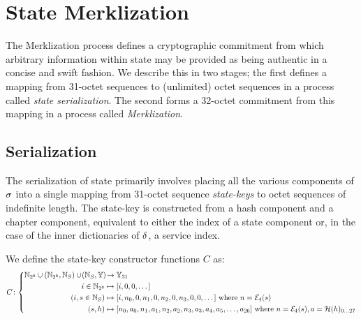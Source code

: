 \section{State Merklization}\label{sec:statemerklization}

The Merklization process defines a cryptographic commitment from which arbitrary information within state may be provided as being authentic in a concise and swift fashion. We describe this in two stages; the first defines a mapping from 31-octet sequences to (unlimited) octet sequences in a process called \emph{state serialization}. The second forms a 32-octet commitment from this mapping in a process called \emph{Merklization}.

\subsection{Serialization}

The serialization of state primarily involves placing all the various components of $\sigma$ into a single mapping from 31-octet sequence \emph{state-keys} to octet sequences of indefinite length. The state-key is constructed from a hash component and a chapter component, equivalent to either the index of a state component or, in the case of the inner dictionaries of $\delta$, a service index.

We define the state-key constructor functions $C$ as:
\begin{equation}
  C\colon\abracegroup{
    \Nbits{8} \cup (\Nbits{8}, \serviceid) \cup \tup{\serviceid, \blob} &\to \blob_{31} \\
    i \in \Nbits{8} &\mapsto [i, 0, 0, \dots] \\
    (i, s \in \serviceid) &\mapsto [i, n_0, 0, n_1, 0, n_2, 0, n_3, 0, 0, \dots]\ \where n = \se_4(s) \\
    (s, h) &\mapsto [n_0, a_0, n_1, a_1, n_2, a_2, n_3, a_3, a_4, a_5, \dots, a_{26}]\ \where n = \se_4(s), a = \blake(h)_{0\dots 27}
  }
\end{equation}

